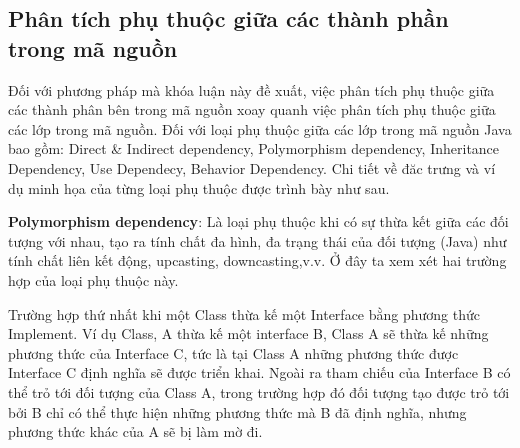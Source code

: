 \documentclass[12pt]{report}
\begin{document}
\subsection{Phân tích phụ thuộc giữa các thành phần trong mã nguồn}
Đối với phương pháp mà khóa luận này đề xuất, việc phân tích phụ thuộc giữa các thành phân bên trong mã nguồn xoay quanh việc phân tích phụ thuộc giữa các lớp trong mã nguồn. Đối với loại phụ thuộc giữa các lớp trong mã nguồn Java bao gồm: Direct \& Indirect dependency, Polymorphism dependency, Inheritance Dependency, Use Dependecy, 	Behavior Dependency. Chi tiết về đăc trưng và ví dụ minh họa của từng loại phụ thuộc được trình bày như sau.

\noindent \textbf{Polymorphism dependency}: Là loại phụ thuộc khi có sự thừa kết giữa các đối tượng với nhau, tạo ra tính chất đa hình, đa trạng thái của đối tượng (Java) như tính chất liên kết động, upcasting, downcasting,v.v. Ở đây ta xem xét hai trường hợp của loại phụ thuộc này. 

\noindent Trường hợp thứ nhất khi một Class thừa kế một Interface bằng phương thức Implement. Ví dụ Class, A  thừa kế một interface B, Class A sẽ thừa kế những phương thức của Interface C, tức là tại Class A những phương thức được Interface C định nghĩa sẽ được triển khai. Ngoài ra tham chiếu của Interface B có thể trỏ tới đối tượng của Class A, trong trường hợp đó đối tượng tạo được trỏ tới bởi B chỉ có thể thực hiện những phương thức mà B đã định nghĩa, nhưng phương thức khác của A sẽ bị làm mờ đi. 
\end{document}
